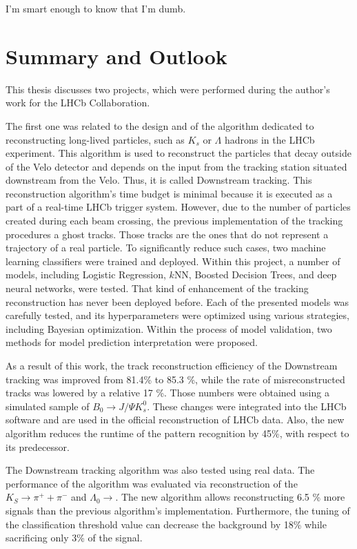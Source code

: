\begin{savequote}[75mm] 
I'm smart enough to know that I'm dumb.

\end{savequote}

\chapter{Summary and Outlook}

This thesis discusses two projects, which were performed during the author's work for the LHCb Collaboration. 

The first one was related to the design and of the algorithm dedicated to reconstructing long-lived particles, such as $K_{s}$ or $\Lambda$ hadrons in the LHCb experiment. This algorithm is used to reconstruct the particles that decay outside of the Velo detector and depends on the input from the tracking station situated downstream from the Velo. Thus, it is called Downstream tracking. This reconstruction algorithm's time budget is minimal because it is executed as a part of a real-time LHCb trigger system.  However, due to the number of particles created during each beam crossing, the previous implementation of the tracking procedures a ghost tracks. Those tracks are the ones that do not represent a trajectory of a real particle. To significantly reduce such cases, two machine learning classifiers were trained and deployed. 
Within this project, a number of models, including Logistic Regression, $k$NN, Boosted Decision Trees, and deep neural networks, were tested.
That kind of enhancement of the tracking reconstruction has never been deployed before. 
Each of the presented models was carefully tested, and its hyperparameters were optimized using various strategies, including Bayesian optimization. Within the process of model validation, two methods for model prediction interpretation were proposed. 

As a result of this work, the track reconstruction efficiency of the Downstream tracking was improved from 81.4\% to 85.3 \%, while the rate of misreconstructed tracks was lowered by a relative 17 \%. Those numbers were obtained using a simulated sample of  $B_0 \rightarrow J/\Psi K^{0}_{s}$. 
These changes were integrated into the LHCb software and are used in the official reconstruction of LHCb data. Also, the new algorithm reduces the runtime of the pattern recognition by 45\%, with respect to its predecessor.  

The Downstream tracking algorithm was also tested using real data. The performance of the algorithm was evaluated via reconstruction of the $K_S \rightarrow \pi^{+} + \pi^{-}$  and $\Lambda_{0} \rightarrow $.  The new algorithm allows reconstructing 6.5 \% more signals than the previous algorithm's implementation.   
Furthermore, the tuning of the classification threshold value can decrease the background by 18\% while sacrificing only 3\% of the signal. 

